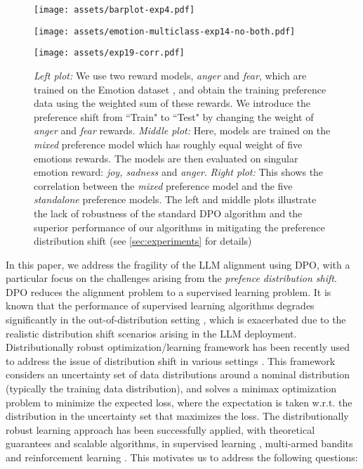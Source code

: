 \begin{figure*}[!ht]
    \centering
    \begin{minipage}{0.32\textwidth}
        \centering
        \texttt{[image: assets/barplot-exp4.pdf]}
    \end{minipage}
    \hfill
    \begin{minipage}{0.32\textwidth}
        \centering
        \texttt{[image: assets/emotion-multiclass-exp14-no-both.pdf]}
    \end{minipage}
    \hfill
    \begin{minipage}{0.32\textwidth}
        \centering
        \texttt{[image: assets/exp19-corr.pdf]}
    \end{minipage}
    \caption{\textit{Left plot:} We use two reward models, \textit{anger} and \textit{fear}, which are trained on the Emotion dataset \citep{saravia-etal-2018-carer}, and obtain the training preference data using the weighted sum of these rewards. We introduce the preference shift from ``Train" to ``Test" by changing the weight of \textit{anger} and \textit{fear} rewards. \textit{Middle plot:} Here, models are trained on the \textit{mixed} preference model which has roughly equal weight of five emotions rewards. The models are then evaluated on singular emotion reward: \textit{joy, sadness} and \textit{anger}. \textit{Right plot:} This  shows the correlation between the \textit{mixed} preference model and the five \textit{standalone} preference models. The left and middle plots illustrate the lack of robustness of the standard DPO algorithm and the superior performance of our algorithms in mitigating the preference distribution shift (see \cref{sec:experiments} for details)
    }
    \label{fig:secondary-diagram}
\end{figure*}
In this paper, we address the fragility of the LLM alignment using DPO, with a particular focus on the challenges arising from the \emph{prefence distribution shift}.  DPO reduces the alignment problem to a supervised learning problem. It is known that the performance of supervised learning algorithms degrades significantly in the out-of-distribution setting \cite{taori2020measuring,koh2021wilds}, which is exacerbated due to the realistic distribution shift scenarios arising in the LLM deployment. Distributionally robust optimization/learning framework has been recently used to address the issue of distribution shift in various settings \cite{duchi2018learning, kuhn2019wasserstein, chen2020distributionally}. This framework considers an uncertainty set of data distributions around a nominal distribution (typically the training data distribution), and solves a minimax optimization problem to minimize the expected loss, where the expectation is taken w.r.t. the distribution in the uncertainty set that maximizes the loss. The distributionally robust learning approach has been successfully applied,  with theoretical guarantees and scalable algorithms,  in supervised learning \cite{chen2018robust, namkoong2016stochastic, levy2020large}, multi-armed bandits \cite{si2020distributionally, yang2023distributionally} and reinforcement learning \cite{wang22policygradient,panaganti-rfqi, zhou2024natural}. This motivates us to address the following questions:
